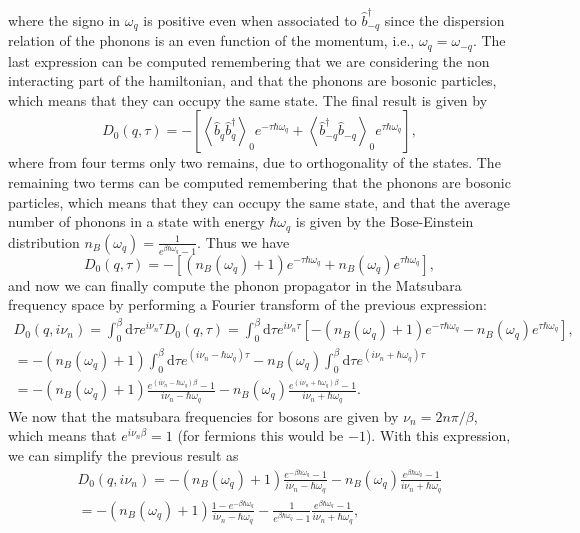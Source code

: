 where the signo in \(\omega_q\) is positive even when associated to \(\hat{b}^{\dagger}_{-q}\) since the dispersion relation of the phonons is an even function of the momentum, i.e., \(\omega_q = \omega_{-q}\). The last expression can be computed remembering that we are considering the non interacting part of the hamiltonian, and that the phonons are bosonic particles, which means that they can occupy the same state. The final result is given by
\[
    D_0 (q,\tau) = - \left[ \left\langle \hat{b}_q\hat{b}_{q}^\dagger \right\rangle_0 e^{-\tau \hbar \omega_q} + \left\langle \hat{b}^\dagger_{-q}\hat{b}_{-q} \right\rangle_0 e^{\tau \hbar \omega_q} \right],
\]
where from four terms only two remains, due to orthogonality of the states. The remaining two terms can be computed remembering that the phonons are bosonic particles, which means that they can occupy the same state, and that the average number of phonons in a state with energy \(\hbar \omega_q\) is given by the Bose-Einstein distribution \(n_B(\omega_q) = \frac{1}{e^{\beta \hbar \omega_q} - 1}\). Thus we have
\[
    D_0 (q, \tau) = - \left[ (n_B(\omega_q) + 1) e^{-\tau \hbar \omega_q} + n_B(\omega_q) e^{\tau \hbar \omega_q} \right],
\]
and now we can finally compute the phonon propagator in the Matsubara frequency space by performing a Fourier transform of the previous expression:
\[
    \begin{aligned}
        D_0(q, i \nu_n) = \int_0^{\beta} \mathrm{d} \tau e^{i \nu_n \tau} D_0(q, \tau) = \int_0^{\beta} \mathrm{d} \tau e^{i \nu_n \tau} \left[ - (n_B(\omega_q) + 1) e^{-\tau \hbar \omega_q} - n_B(\omega_q) e^{\tau \hbar \omega_q} \right], \\
        = - (n_B(\omega_q) + 1) \int_0^{\beta} \mathrm{d} \tau e^{(i \nu_n - \hbar \omega_q) \tau} - n_B(\omega_q) \int_0^{\beta} \mathrm{d} \tau e^{(i \nu_n + \hbar \omega_q) \tau}                                                           \\
        = - (n_B(\omega_q) + 1) \frac{e^{(i \nu_n - \hbar \omega_q) \beta} - 1}{i \nu_n - \hbar \omega_q} - n_B(\omega_q) \frac{e^{(i \nu_n + \hbar \omega_q) \beta} - 1}{i \nu_n + \hbar \omega_q}.
    \end{aligned}
\]
We now that the matsubara frequencies for bosons are given by \(\nu_n = 2 n \pi / \beta\), which means that \(e^{i \nu_n \beta} = 1\) (for fermions this would be \(-1\)). With this expression, we can simplify the previous result as
\[
    \begin{aligned}
        D_{0} (q, i \nu_n) = - (n_B(\omega_q) + 1) \frac{e^{-\beta \hbar \omega_q} - 1}{i \nu_n - \hbar \omega_q} - n_B(\omega_q) \frac{e^{\beta \hbar \omega_q} - 1}{i \nu_n + \hbar \omega_q} \\
        = - (n_B(\omega_q) + 1) \frac{1 - e^{-\beta \hbar \omega_q}}{i \nu_n - \hbar \omega_q} - \frac{1}{e^{\beta \hbar \omega_q} - 1} \frac{e^{\beta \hbar \omega_q} - 1}{i \nu_n + \hbar \omega_q},
    \end{aligned}
\]
